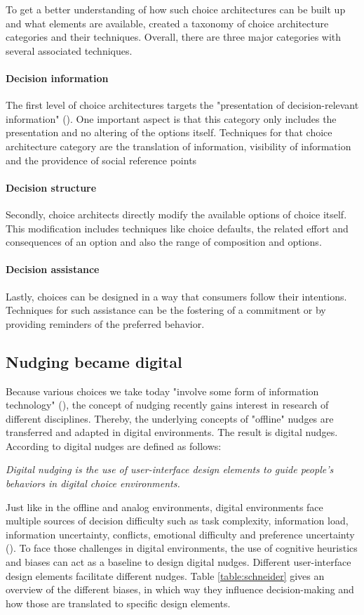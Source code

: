 To get a better understanding of how such choice architectures can be built up and what elements are available,  \cite{munscher_review_2016} created a taxonomy of choice architecture categories and their techniques. Overall, there are three major categories with several associated techniques. 
\paragraph{Decision information}
The first level of choice architectures targets the "presentation of decision-relevant information" (\cite{munscher_review_2016}). One important aspect is that this category only includes the presentation and no altering of the options itself. Techniques for that choice architecture category are the translation of information, visibility of information and the providence of social reference points
\paragraph{Decision structure}
Secondly, choice architects directly modify the available options of choice itself. This modification includes techniques like choice defaults, the related effort and consequences of an option and also the range of composition and options.
\paragraph{Decision assistance}
Lastly, choices can be designed in a way that consumers follow their intentions. Techniques for such assistance can be the fostering of a commitment or by providing reminders of the preferred behavior.

\subsection{Nudging became digital}
Because various choices we take today "involve some form of information technology" (\cite{johnson_beyond_2012}), the concept of nudging recently gains interest in research of different disciplines. Thereby, the underlying concepts of "offline" nudges are transferred and adapted in digital environments. The result is digital nudges. According to \cite{weinmann_digital_2016} digital nudges are defined as follows:
\begin{center}
\textit{Digital nudging is the use of user-interface design elements to guide people's behaviors in digital choice environments.}
\end{center}
Just like in the offline and analog environments, digital environments face multiple sources of decision difficulty such as task complexity, information load, information uncertainty, conflicts, emotional difficulty and preference uncertainty (\cite{broniarczyk_decision_2014}). To face those challenges in digital environments, the use of cognitive heuristics and biases can act as a baseline to design digital nudges. Different user-interface design elements facilitate different nudges. Table \ref{table:schneider} gives an overview of the different biases, in which way they influence decision-making and how those are translated to specific design elements.

